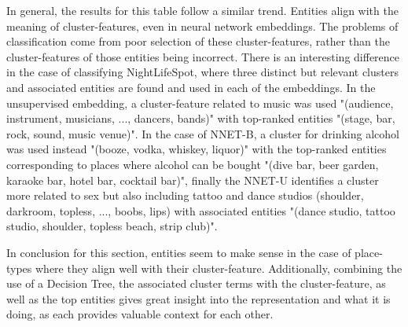 In general, the results for this table follow a similar trend. Entities align with the meaning of cluster-features, even in neural network embeddings. The problems of classification come from poor selection of these cluster-features, rather than the cluster-features of those entities being incorrect. There is an interesting difference in the case of classifying NightLifeSpot, where three distinct but relevant clusters and associated entities are found and used in each of the embeddings. In the unsupervised embedding, a cluster-feature related to music was used "(audience, instrument, musicians, ..., dancers, bands)" with top-ranked entities  "(stage, bar, rock, sound, music venue)". In the case of NNET-B, a cluster for drinking alcohol was used instead "(booze, vodka, whiskey, liquor)" with the top-ranked entities corresponding to places where  alcohol can be bought "(dive bar, beer garden, karaoke bar, hotel bar, cocktail bar)", finally the NNET-U identifies a cluster more related to sex but also including tattoo and dance studios (shoulder, darkroom, topless, ..., boobs, lips) with associated entities  "(dance studio, tattoo studio, shoulder, topless beach, strip club)". 

In conclusion for this section, entities seem to make sense in the case of place-types where they align well with their cluster-feature. Additionally, combining the use of a Decision Tree, the associated cluster terms with the cluster-feature, as well as the top entities gives great insight into the representation and what it is doing, as each provides valuable context for each other. 

